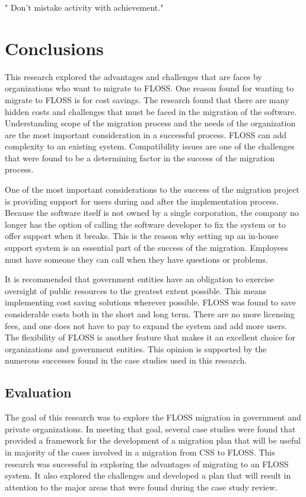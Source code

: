 \newpage
\begin{savequote}[108mm]
 " Don't mistake activity with achievement."
\end{savequote}
\chapter{Conclusions}
\label{chap:conclusions}
\vspace{-2cm}

This research explored the advantages and challenges that are faces by organizations who want to migrate to FLOSS. One reason found for wanting to migrate to FLOSS is for cost savings. The research found that there are many hidden costs and challenges that must be faced in the migration of the software. Understanding scope of the migration process and the needs of the organization are the most important consideration in a successful process. FLOSS can add complexity to an existing system. Compatibility issues are one of the challenges that were found to be a determining factor in the success of the migration process. 

One of the most important considerations to the success of the migration project is providing support for users during and after the implementation process. Because the software itself is not owned by a single corporation, the company no longer has the option of calling the software developer to fix the system or to offer support when it breaks. This is the reason why setting up an in-house support system is an essential part of the success of the migration. Employees must have someone they can call when they have questions or problems. 

It is recommended that government entities have an obligation to exercise oversight of public resources to the greatest extent possible. This means implementing cost saving solutions wherever possible. FLOSS was found to save considerable costs both in the short and long term. There are no more licensing fees, and one does not have to pay to expand the system and add more users. The flexibility of FLOSS is another feature that makes it an excellent choice for organizations and government entities. This opinion is supported by the numerous successes found in the case studies used in this research. 

\section{Evaluation}
The goal of this research was to explore the FLOSS migration in government and private organizations. In meeting that goal, several case studies were found that provided a framework for the development of a migration plan that will be useful in majority of the cases involved in a migration from CSS to FLOSS. This research was successful in exploring the advantages of migrating to an FLOSS system. It also explored the challenges and developed a plan that will result in attention to the major areas that were found during the case study review.

